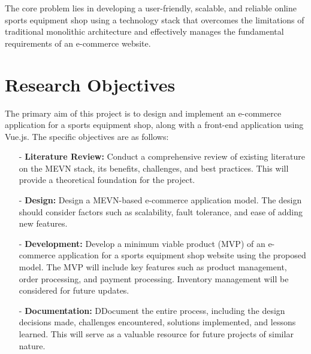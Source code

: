 The core problem lies in developing a user-friendly, scalable, and reliable online sports equipment shop using a technology stack that overcomes the limitations of traditional monolithic architecture and effectively manages the fundamental requirements of an e-commerce website.


\section{Research Objectives}
The primary aim of this project is to design and implement an e-commerce application for a sports equipment shop, along with a front-end application using Vue.js. The specific objectives are as follows:\begin{itemize}
    \item[-] \textbf{Literature Review:} Conduct a comprehensive review of existing literature on the MEVN stack, its benefits, challenges, and best practices. This will provide a theoretical foundation for the project.
    \item[-] \textbf{Design:} Design a MEVN-based e-commerce application model. The design should consider factors such as scalability, fault tolerance, and ease of adding new features.
    \item[-] \textbf{Development:} Develop a minimum viable product (MVP) of an e-commerce application for a sports equipment shop website using the proposed model. The MVP will include key features such as product management, order processing, and payment processing. Inventory management will be considered for future updates.
    \item[-] \textbf{Documentation:} DDocument the entire process, including the design decisions made, challenges encountered, solutions implemented, and lessons learned. This will serve as a valuable resource for future projects of similar nature.
\end{itemize}
